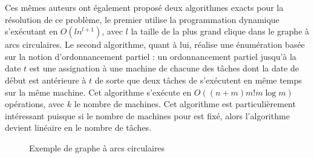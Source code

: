 \documentclass[a4paper,11pt]{report}
\begin{document}
Ces mêmes auteurs ont également
proposé deux algorithmes exacts pour la résolution de ce problème, le premier utilise la
programmation dynamique s'exécutant en $O(ln^{l+1})$, avec $l$ la taille de la plus grand clique dans
le graphe à arcs circulaires. Le second algorithme, quant à lui, réalise une énumération  basée sur
la notion d'ordonnancement partiel : un ordonnancement partiel jusqu'à la date $t$ est une
assignation à une machine de chacune des tâches dont la date de début est antérieure à $t$ de sorte
que deux tâches de s'exécutent en même temps sur la même machine. Cet algorithme s'exécute en
$O\left( (n + m) m! m \log m \right)$ opérations, avec $k$ le nombre de machines. Cet algorithme est
particulièrement intéressant puisque si le nombre de machines pour \isma{} est fixé, alors l'algorithme
devient linéaire en le nombre de tâches.

\begin{figure}
    \centering
    \caption{Exemple de graphe à arcs circulaires}
    \label{fig:ex_ac}
\end{figure}
\end{document}

